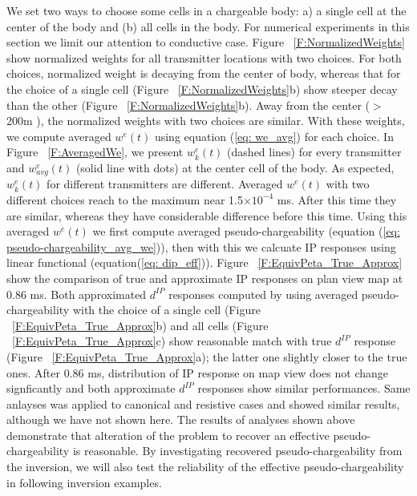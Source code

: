 \documentclass[a4paper, 11pt]{article}
\newcommand{\dip}{d^{IP}}
\begin{document}
We set two ways to choose some cells in a chargeable body: a) a single cell at the center of the body and (b) all cells in the body. 
For numerical experiments in this section we limit our attention to conductive case. 
Figure ~\ref{F:NormalizedWeights} show normalized weights for all transmitter locations with two choices.
For both choices, normalized weight is decaying from the center of body, whereas that for the choice of a single cell (Figure ~\ref{F:NormalizedWeights}b) show steeper decay than the other (Figure ~\ref{F:NormalizedWeights}b). 
Away from the center ($>$200m ), the normalized weights with two choices are similar. 
With these weights, we compute averaged $w^e(t)$ using equation (\ref{eq: we_avg}) for each choice. 
In Figure ~\ref{F:AveragedWe}, we present $w^e_k(t)$ (dashed lines) for every transmitter and $w^e_{avg}(t)$ (solid line with dots) at the center cell of the body. 
As expected, $w^e_k(t)$ for different transmitters are different. 
Averaged $w^e(t)$ with two different choices reach to the maximum near 1.5$\times 10^{-4}$ ms. 
After this time they are similar, whereas they have considerable difference before this time. 
Using this averaged $w^e(t)$ we first compute averaged pseudo-chargeability (equation (\ref{eq: pseudo-chargeability_avg_we})), then with this we calcuate IP responses using linear functional (equation(\ref{eq: dip_eff})). 
Figure ~\ref{F:EquivPeta_True_Approx} show the comparison of true and approximate IP responses on plan view map at 0.86 ms. 
Both approximated $\dip$ responses computed by using averaged pseudo-chargeability with the choice of a single cell (Figure ~\ref{F:EquivPeta_True_Approx}b) and all cells (Figure ~\ref{F:EquivPeta_True_Approx}c) show reasonable match with true $\dip$ response (Figure ~\ref{F:EquivPeta_True_Approx}a); the latter one slightly closer to the true ones. 
After 0.86 ms, distribution of IP response on map view does not change signficantly and both approximate $\dip$ responses show similar performances.
Same anlayses was applied to canonical and resistive cases and showed similar results, although we have not shown here. 
The results of analyses shown above demonstrate that alteration of the problem to recover an effective pseudo-chargeability is reasonable.
By investigating recovered pseudo-chargeability from the inversion, we will also test the reliability of the effective pseudo-chargeability in following inversion examples.
\end{document}
